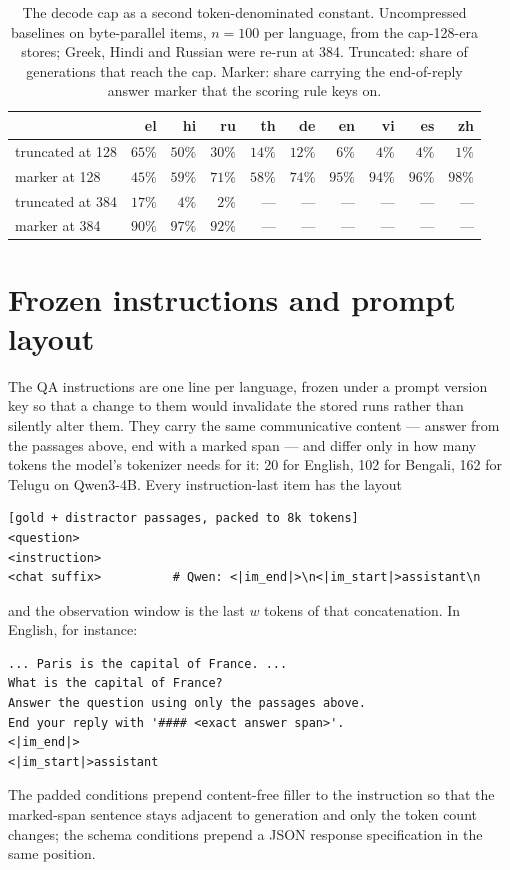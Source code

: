 \documentclass{article}
\begin{document}
\begin{table}[h]
\caption{The decode cap as a second token-denominated constant.
Uncompressed baselines on byte-parallel items, $n{=}100$ per language,
from the cap-128-era stores; Greek, Hindi and Russian were re-run at 384.
Truncated: share of generations that reach the cap. Marker: share
carrying the end-of-reply answer marker that the scoring rule keys on.}
\label{tab:cap}
\centering
\small
\begin{tabular}{lrrrrrrrrr}
\toprule
 & el & hi & ru & th & de & en & vi & es & zh \\
\midrule
truncated at 128 & $65\%$ & $50\%$ & $30\%$ & $14\%$ & $12\%$ & $6\%$ & $4\%$ & $4\%$ & $1\%$ \\
marker at 128 & $45\%$ & $59\%$ & $71\%$ & $58\%$ & $74\%$ & $95\%$ & $94\%$ & $96\%$ & $98\%$ \\
\addlinespace
truncated at 384 & $17\%$ & $4\%$ & $2\%$ & --- & --- & --- & --- & --- & --- \\
marker at 384 & $90\%$ & $97\%$ & $92\%$ & --- & --- & --- & --- & --- & --- \\
\bottomrule
\end{tabular}
\end{table}

\section{Frozen instructions and prompt layout}
\label{app:prompt}

The QA instructions are one line per language, frozen under a prompt
version key so that a change to them would invalidate the stored runs
rather than silently alter them. They carry the same communicative
content --- answer from the passages above, end with a marked span ---
and differ only in how many tokens the model's tokenizer needs for it:
20 for English, 102 for Bengali, 162 for Telugu on Qwen3-4B. Every
instruction-last item has the layout
\begin{verbatim}
[gold + distractor passages, packed to 8k tokens]
<question>
<instruction>
<chat suffix>          # Qwen: <|im_end|>\n<|im_start|>assistant\n
\end{verbatim}
and the observation window is the last $w$ tokens of that
concatenation. In English, for instance:
\begin{verbatim}
... Paris is the capital of France. ...
What is the capital of France?
Answer the question using only the passages above.
End your reply with '#### <exact answer span>'.
<|im_end|>
<|im_start|>assistant
\end{verbatim}
The padded conditions prepend content-free filler to the instruction so
that the marked-span sentence stays adjacent to generation and only the
token count changes; the schema conditions prepend a JSON response
specification in the same position.
\end{document}
